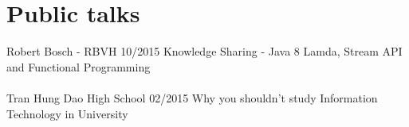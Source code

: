 \section*{Public talks}
\event
{Robert Bosch - RBVH}
{10/2015}
{Knowledge Sharing - Java 8 Lamda, Stream API and Functional Programming}
\\
\\
\event
{Tran Hung Dao High School}
{02/2015}
{Why you shouldn't study Information Technology in University}
